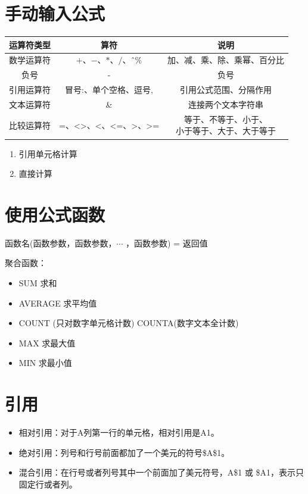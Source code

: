 \section{手动输入公式}

\begin{table}[ht]
    \centering
    \begin{tabular}{|c|c|c|}
    \hline
    运算符类型 & 算符 & 说明 \\ \hline
    数学运算符 & $+$、$-$、$*$、$/$、\^ \ \% & 加、减、乘、除、乘幂、百分比 \\ \hline
    负号 & - & 负号 \\ \hline
    引用运算符 & 冒号:、单个空格、逗号, & 引用公式范围、分隔作用 \\ \hline
    文本运算符 & \& & 连接两个文本字符串 \\ \hline
    比较运算符 & =、<>、<、<=、>、>= & \makecell{等于、不等于、小于、\\ 小于等于、大于、大于等于} \\ \hline
    \end{tabular}
    \end{table}

    \begin{enumerate}
        \item 引用单元格计算
        \item 直接计算
    \end{enumerate}

\section{使用公式函数}

函数名(函数参数，函数参数，$\cdots$ ，函数参数) = 返回值

聚合函数：
\begin{itemize}
    \item SUM 求和
    \item AVERAGE 求平均值
    \item COUNT (只对数字单元格计数) COUNTA(数字文本全计数)
    \item MAX 求最大值
    \item MIN 求最小值
\end{itemize}

\section{引用}

\begin{itemize}
    \item 相对引用：对于A列第一行的单元格，相对引用是A1。
    \item 绝对引用：列号和行号前面都加了一个美元的符号\$A\$1。
    \item 混合引用：在行号或者列号其中一个前面加了美元符号，A\$1 或 \$A1，表示只固定行或者列。
\end{itemize}


